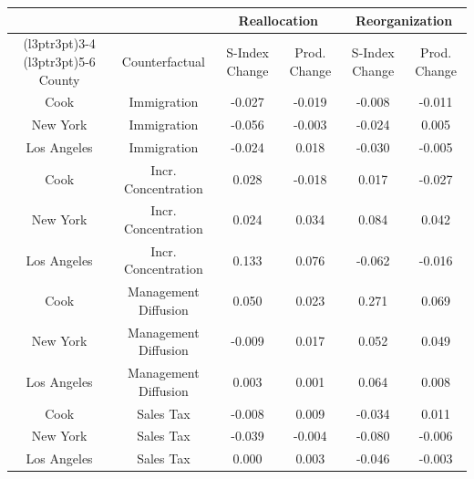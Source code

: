 
\centering
\begin{tabular}[t]{cccccc}
\toprule
\multicolumn{1}{c}{ } & \multicolumn{1}{c}{ } & \multicolumn{2}{c}{Reallocation} & \multicolumn{2}{c}{Reorganization} \\
\cmidrule(l{3pt}r{3pt}){3-4} \cmidrule(l{3pt}r{3pt}){5-6}
County & Counterfactual & S-Index Change & Prod. Change & S-Index Change & Prod. Change\\
\midrule
Cook & Immigration & -0.027 & -0.019 & -0.008 & -0.011\\
New York & Immigration & -0.056 & -0.003 & -0.024 & 0.005\\
Los Angeles & Immigration & -0.024 & 0.018 & -0.030 & -0.005\\
Cook & Incr. Concentration & 0.028 & -0.018 & 0.017 & -0.027\\
New York & Incr. Concentration & 0.024 & 0.034 & 0.084 & 0.042\\
Los Angeles & Incr. Concentration & 0.133 & 0.076 & -0.062 & -0.016\\
Cook & Management Diffusion & 0.050 & 0.023 & 0.271 & 0.069\\
New York & Management Diffusion & -0.009 & 0.017 & 0.052 & 0.049\\
Los Angeles & Management Diffusion & 0.003 & 0.001 & 0.064 & 0.008\\
Cook & Sales Tax & -0.008 & 0.009 & -0.034 & 0.011\\
New York & Sales Tax & -0.039 & -0.004 & -0.080 & -0.006\\
Los Angeles & Sales Tax & 0.000 & 0.003 & -0.046 & -0.003\\
\bottomrule
\end{tabular}